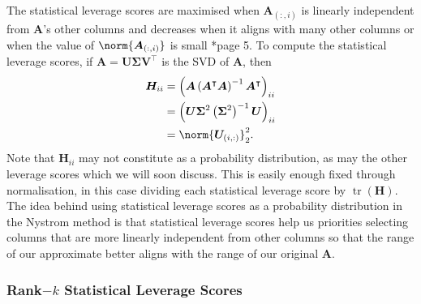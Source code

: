 The statistical leverage scores are maximised when $\bm{A}_{(:,i)}$ is linearly independent from $\bm{A}$'s other columns and decreases when it aligns with many other columns or when the value of $\norm{\bm{A}_{(:,i)}}$ is small \cite{DBLP:journals/corr/CohenMM15}*{page 5}. To compute the statistical leverage scores, if $\bm{A} = \bm{U} \bm{\Sigma} \bm{V}^{\intercal}$ is the SVD of $\bm{A}$, then
\begin{align*}
    \bm{H}_{ii} & = \left( \bm{A} \left( \bm{A}^{\intercal} \bm{A} \right)^{-1} \bm{A}^{\intercal} \right)_{ii} \\
                & = \left( \bm{U} \bm{\Sigma}^{2} \left( \bm{\Sigma}^{2} \right)^{-1} \bm{U} \right)_{ii}       \\
                & = \norm{\bm{U}_{(i,:)}}_2^2.
\end{align*}
Note that $\bm{H}_{ii}$ may not constitute as a probability distribution, as may the other leverage scores which we will soon discuss. This is easily enough fixed through normalisation, in this case dividing each statistical leverage score by $\operatorname{tr} \left( \bm{H} \right)$. The idea behind using statistical leverage scores as a probability distribution in the Nystrom method is that statistical leverage scores help us priorities selecting columns that are more linearly independent from other columns so that the range of our approximate better aligns with the range of our original $\bm{A}$.

\subsubsection{Rank$-k$ Statistical Leverage Scores}

